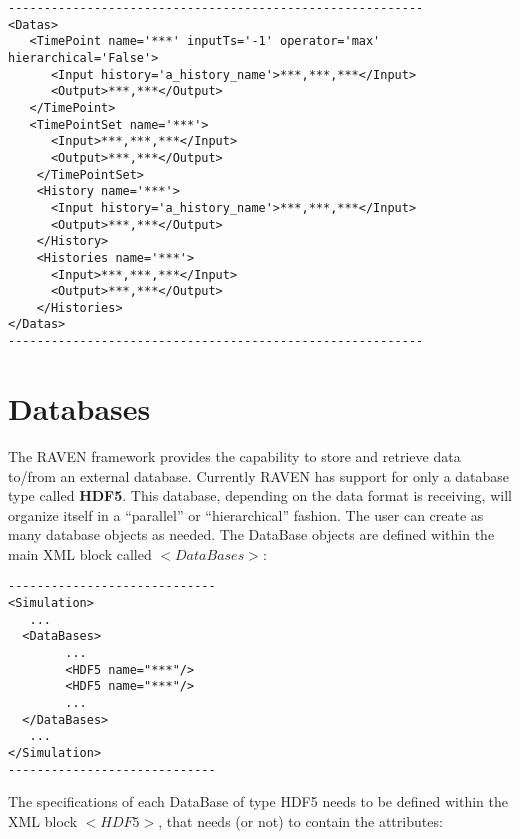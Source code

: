 \begin{lstlisting}[style=XML]
----------------------------------------------------------
<Datas> 
   <TimePoint name='***' inputTs='-1' operator='max' hierarchical='False'>  
      <Input history='a_history_name'>***,***,***</Input>
      <Output>***,***</Output>
   </TimePoint> 
   <TimePointSet name='***'>  
      <Input>***,***,***</Input>
      <Output>***,***</Output>
    </TimePointSet> 
    <History name='***'>  
      <Input history='a_history_name'>***,***,***</Input>
      <Output>***,***</Output>
    </History> 
    <Histories name='***'>  
      <Input>***,***,***</Input>
      <Output>***,***</Output>
    </Histories> 
</Datas>
----------------------------------------------------------
\end{lstlisting}

\section{Databases}
\label{sec:Databases}
The RAVEN framework provides the capability to store and retrieve data to/from an external database. Currently RAVEN has support for only a database type called \textbf{HDF5}. This database, depending on the data format is receiving, will organize itself in a ``parallel'' or ``hierarchical'' fashion. The user can create as many database objects as needed.
The DataBase objects are defined  within the main XML block called $<DataBases>$:
\begin{lstlisting}[style=XML]
-----------------------------
<Simulation>
   ...
  <DataBases>
        ...
        <HDF5 name="***"/>
        <HDF5 name="***"/>
        ...
  </DataBases>
   ...
</Simulation>
-----------------------------
\end{lstlisting}
The specifications of each DataBase of type HDF5 needs to be defined within the XML block $<HDF5>$, that  needs (or not) to contain  the attributes:
\vspace{-5mm}
